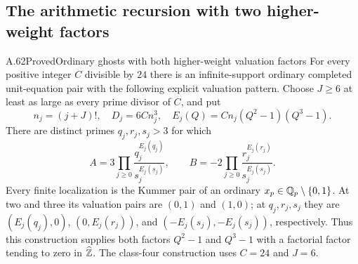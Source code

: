 \subsection{The arithmetic recursion with two higher-weight factors}

\begin{statement}{A.62}{Proved}{Ordinary ghosts with both higher-weight valuation factors}
For every positive integer $C$ divisible by $24$ there
is an infinite-support ordinary completed unit-equation
pair with the following explicit valuation pattern.
Choose $J\ge6$ at least as large as every prime
divisor of $C$, and put
\[
 n_j=(j+J)!,\quad D_j=6Cn_j^3,\quad
 E_j(Q)=Cn_j(Q^2-1)(Q^3-1).
 \tag{A.62.1}
\]
There are distinct primes $q_j,r_j,s_j>3$ for which
\[
 A=3\prod_{j\ge0}\frac{q_j^{E_j(q_j)}}{s_j^{E_j(s_j)}},
 \qquad
 B=-2\prod_{j\ge0}\frac{r_j^{E_j(r_j)}}{s_j^{E_j(s_j)}}.
 \tag{A.62.2}
\]
Every finite localization is the Kummer pair of an
ordinary $x_p\in\mathbb Q_p\setminus\{0,1\}$.
At two and three its valuation pairs are $(0,1)$
and $(1,0)$; at $q_j,r_j,s_j$ they are
$(E_j(q_j),0)$, $(0,E_j(r_j))$, and
$(-E_j(s_j),-E_j(s_j))$, respectively.
Thus this construction supplies both factors
$Q^2-1$ and $Q^3-1$ with a factorial factor
tending to zero in $\widehat{\mathbb Z}$.
The class-four construction uses $C=24$ and $J=6$.
\end{statement}
